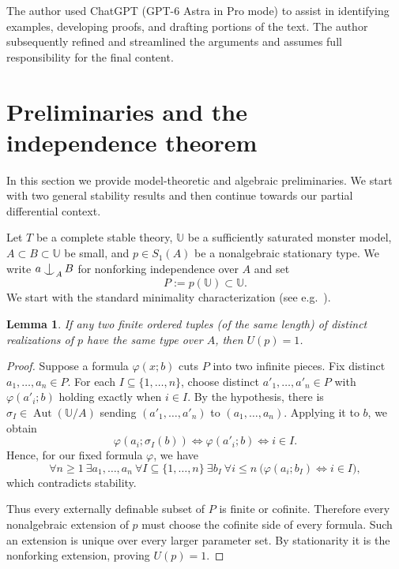 \documentclass[11pt,a4paper]{amsart}
\newtheorem{lemma}[theorem]{Lemma}
\theoremstyle{definition}
\newcommand{\Uu}{{\mathds{U}}}
\def\Ind#1#2{#1\setbox0=\hbox{$#1x$}\kern\wd0\hbox to
  0pt{\hss$#1\mid$\hss} \lower.9\ht0\hbox to
  0pt{\hss$#1\smile$\hss}\kern\wd0}
\def\ind{\mathop{\mathpalette\Ind{}}}
\begin{document}
The author used ChatGPT (GPT-6 Astra in Pro mode) to assist in identifying examples, developing proofs, and drafting portions of the text. The author subsequently refined and streamlined the arguments and assumes full responsibility for the final content.


\section{Preliminaries and the independence theorem}\label{sec2}

In this section we provide model-theoretic and algebraic preliminaries. We start with two general stability results and then continue towards our partial differential context.

Let $T$ be a complete stable theory, $\Uu$ be a
sufficiently saturated monster model, $A\subset B\subset \Uu$ be small, and $p\in S_1(A)$
be a nonalgebraic stationary type. We write $a\ind_A B$ for nonforking independence over $A$ and set 
\[
P:=p(\Uu)\subset \Uu.
\]
We start with the standard minimality characterization (see e.g.~\cite[Remark 5.6]{Pillay}).
\begin{lemma}\label{indiscernible-minimal}
If any two finite ordered tuples (of the same length)
of distinct realizations of $p$ have the same type
over $A$, then $U(p)=1$.
\end{lemma}

\begin{proof}
Suppose a formula $\varphi(x;b)$ cuts $P$ into two
infinite pieces. Fix distinct $a_1,\ldots,a_n\in P$. For each
$I\subseteq\{1,\ldots,n\}$, choose distinct $a'_1,\ldots,a'_n\in P$
with $\varphi(a'_i;b)$ holding exactly when $i\in I$. By the hypothesis, there is $\sigma_I\in \operatorname{Aut}(\Uu/A)$
 sending $(a'_1,\ldots,a'_n)$ to
$(a_1,\ldots,a_n)$. Applying it to $b$, we obtain
\[
\varphi(a_i;\sigma_I(b))
\iff \varphi(a'_i;b)
\iff i\in I.
\]
Hence, for our fixed formula $\varphi$, we have
\[
\forall n\geqslant1\ \exists a_1,\ldots,a_n\
\forall I\subseteq\{1,\ldots,n\}\ \exists b_I\
\forall i\leqslant n\
\bigl(\varphi(a_i;b_I)\iff i\in I\bigr),
\]
which contradicts stability.

Thus every externally definable subset of $P$ is finite or cofinite.
Therefore
every nonalgebraic extension of $p$ must choose the cofinite side of
every formula. Such an extension is unique over every larger parameter
set. By stationarity it is the nonforking extension, proving $U(p)=1$.
\end{proof}
\end{document}
